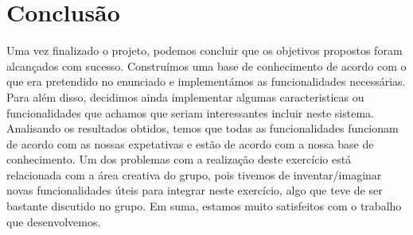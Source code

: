 \chapter{Conclusão}

Uma vez finalizado o projeto, podemos concluir que os objetivos propostos foram alcançados com sucesso. Construímos uma base de conhecimento de acordo com o que era pretendido no enunciado e implementámos as funcionalidades necessárias. Para além disso, decidimos ainda implementar algumas caracteristicas ou funcionalidades que achamos que seriam interessantes incluir neste sistema. Analisando os resultados obtidos, temos que todas as funcionalidades funcionam de acordo com as nossas expetativas e estão de acordo com a nossa base de conhecimento. Um dos problemas com a realização deste exercício está relacionada com a área creativa do grupo, pois tivemos de inventar/imaginar novas funcionalidades úteis para integrar neste exercício, algo que teve de ser bastante discutido no grupo. Em suma, estamos muito satisfeitos com o trabalho que desenvolvemos. 




